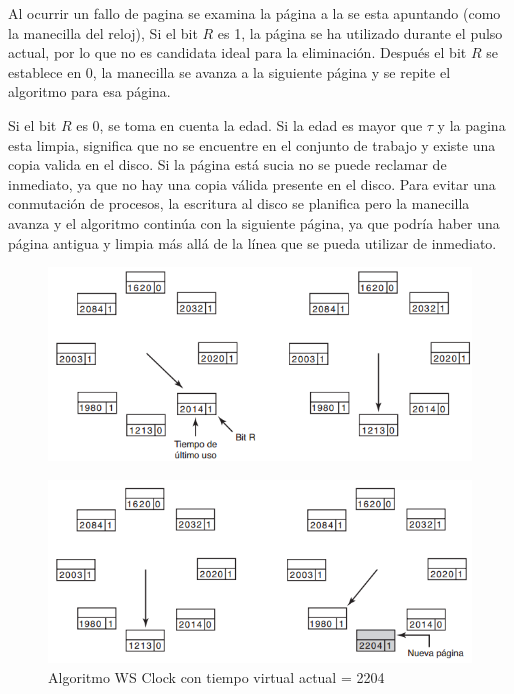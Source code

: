 \documentclass{article}
\begin{document}
Al ocurrir un fallo de pagina se examina la página a la se esta apuntando (como la manecilla del reloj), Si el bit $R$ es 1, la página se ha utilizado durante el pulso actual, por lo que no es candidata ideal para la eliminación. Después el bit $R$ se establece en 0, la manecilla se avanza a la siguiente página y se repite el algoritmo para esa página.

Si el bit $R$ es 0, se toma en cuenta la edad. Si la edad es mayor que $\tau$ y la pagina esta limpia, significa que no se encuentre en el conjunto de trabajo y existe una copia valida en el disco. Si la página está sucia no se puede reclamar de inmediato, ya que no hay una copia válida presente en el disco. Para evitar una conmutación de procesos, la escritura al disco se planifica pero la manecilla avanza y el algoritmo continúa con la siguiente página, ya que podría haber una página antigua y limpia más allá de la línea que se pueda utilizar de inmediato.

\begin{figure}[H]
	\centering
	\includegraphics[scale=0.7]{img/wsclock1.png}
\end{figure}

\begin{figure}[H]
	\centering
	\includegraphics[scale=0.7]{img/wsclock2.png}
	\caption{Algoritmo WS Clock con tiempo virtual actual = 2204}
\end{figure}
\end{document}
